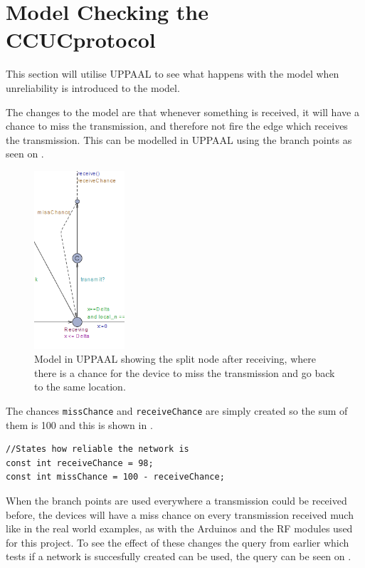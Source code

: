 \section{Model Checking the CCUCprotocol}
This section will utilise UPPAAL to see what happens with the model when unreliability is introduced to the model.

The changes to the model are that whenever something is received, it will have a chance to miss the transmission, and therefore not fire the edge which receives the transmission.
This can be modelled in UPPAAL using the branch points as seen on .

\begin{figure}
\centering
  \includegraphics[width=0.3\textwidth]{Figures/Model/MissChance.png} 
\caption{Model in UPPAAL showing the split node after receiving, where there is a chance for the device to miss the transmission and go back to the same location.}
\label{fig:missTransmission}
\end{figure}

The chances \texttt{missChance} and \texttt{receiveChance} are simply created so the sum of them is 100 and this is shown in .

\begin{lstlisting}[style=UPPAAL, caption={Specifying the realiability of the transmissions, the current numbers result in a 2\% miss chance.}, label={unreliability-UPPAAL}]
//States how reliable the network is
const int receiveChance = 98;
const int missChance = 100 - receiveChance;
\end{lstlisting}

When the branch points are used everywhere a transmission could be received before, the devices will have a miss chance on every transmission received much like in the real world examples, as with the Arduinos and the RF modules used for this project.
To see the effect of these changes the query from earlier which tests if a network is succesfully created can be used, the query can be seen on .

